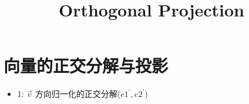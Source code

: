 \documentclass[12pt]{article}
\title{Orthogonal Projection}
\date{}
\begin{document}
\maketitle


\section{向量的正交分解与投影}
\begin{flushleft}
    \begin{itemize}
        向量 $\vec{u} = \begin{bmatrix}
                x \\
                y
            \end{bmatrix}, \vec{v} = \begin{bmatrix}
                x_{1} \\
                y_{1}
            \end{bmatrix}, \vec{u},\vec{v} \neq \vec{0}$

        向量本质是一个空间的移动指令(复合的), 这个空间是一个网格 由基底决定, 对于 u, v 而言是标准基(e1,e2)

        $\vec{u} = xe1 + ye2, \; \vec{v} = x_{1}e1 + y_{1}e2$

        也就是说 $x, y, x_{1}, y_{1} $ 都是基于e1, e2 的移动分量。\\
        现在我们设 $\vec{u} = X$, 这 X 是 无关基底的绝对地址。 \\

        在标准基网格环境, 通过  $xe1 + ye2 \to X $ 表达  \\
        那么我们设 在一组新的基底 $e1^{'}, e2^{'}$ 和新分量 $x_{new}, y_{new}$  表达\\
        存在下列代数组关系：
        \begin{align}
            xe1 + ye2 \to X \\
            x_{new}e1^{'} + y_{new}e2^{'} \to X
        \end{align}

        step1: $e1^{'}, e2^{'}$ 由 $\vec{v}$ 派生(方向归一化的正交分解), 基于 v 诞生的新基底。\\
        step2: $x_{new}e1^{'}, y_{new}e2^{'}$ 与 $xe1,ye2$ 的代数逻辑与几何投影关系。\\


        \vspace{0.5em}
        \item 1: $\vec{v}$ 方向归一化的正交分解($e1^{'},e2^{'}$) \\


\end{itemize}
\end{flushleft}
\end{document}
